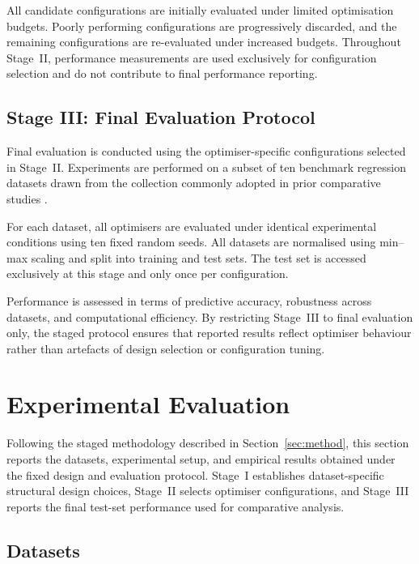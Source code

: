 \documentclass[a4paper,12pt,oneside]{article}
\begin{document}
All candidate configurations are initially evaluated under limited optimisation
budgets.
Poorly performing configurations are progressively discarded, and the remaining
configurations are re-evaluated under increased budgets.
Throughout Stage~II, performance measurements are used exclusively for
configuration selection and do not contribute to final performance reporting.

\subsection{Stage III: Final Evaluation Protocol}

Final evaluation is conducted using the optimiser-specific configurations
selected in Stage~II.
Experiments are performed on a subset of ten benchmark regression datasets drawn
from the collection commonly adopted in prior comparative studies
\cite{zhou2023stochastic}.

For each dataset, all optimisers are evaluated under identical experimental
conditions using ten fixed random seeds.
All datasets are normalised using min--max scaling and split into training and
test sets.
The test set is accessed exclusively at this stage and only once per
configuration.

Performance is assessed in terms of predictive accuracy, robustness across
datasets, and computational efficiency.
By restricting Stage~III to final evaluation only, the staged protocol ensures
that reported results reflect optimiser behaviour rather than artefacts of
design selection or configuration tuning.

\section{Experimental Evaluation}

Following the staged methodology described in
Section~\ref{sec:method}, this section reports the datasets,
experimental setup, and empirical results obtained under the fixed
design and evaluation protocol.
Stage~I establishes dataset-specific structural design choices,
Stage~II selects optimiser configurations, and Stage~III reports the
final test-set performance used for comparative analysis.


\subsection{Datasets}
\end{document}
